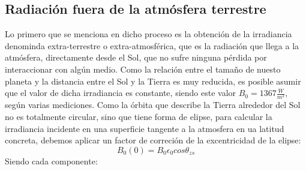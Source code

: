 \subsection{Radiación fuera de la atmósfera terrestre}
\label{sec:org951bb2d}
\label{subsec:radiacion-fuera-atmosfera-terrestre}
Lo primero que se menciona en dicho proceso es la obtención de la irradiancia denominda extra-terrestre o extra-atmosférica, que es la radiación que llega a la atmósfera, directamente desde el Sol, que no sufre ninguna pérdida por interaccionar con algún medio. Como la relación entre el tamaño de nuesto planeta y la distancia entre el Sol y la Tierra es muy reducida, es posible asumir que el valor de dicha irradiancia es constante, siendo este valor \(B_0=1367\frac{W}{m^2}\), según varias mediciones.
Como la órbita que describe la Tierra alrededor del Sol no es totalmente circular, sino que tiene forma de elipse, para calcular la irradiancia incidente en una superficie tangente a la atmosfera en ua latitud concreta, debemos aplicar un factor de correción de la excentricidad de la elipse:
\begin{equation}
B_0(0)=B_0\epsilon_0cos\theta_{zs}
\label{eq:irrad_horiz}
\end{equation}
Siendo cada componente:
